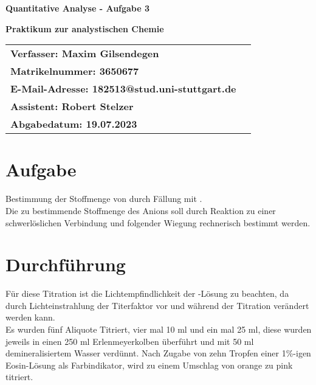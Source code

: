 \documentclass[12pt]{scrartcl} %
\begin{document}
\begin{titlepage}
\begin{center}
\vspace*{2cm}
\begin{LARGE}
\vspace*{1cm}
\textbf{\textsf{Quantitative Analyse - Aufgabe 3\\}}
\end{LARGE}
\vspace*{1cm}
\textbf{\textsf{Praktikum zur analystischen Chemie}}\\
\vspace*{1.5cm}
\begin{table}[H]
\sffamily
\hspace*{3cm}\begin{tabular}{>{\bfseries}l>{\bfseries}l}
Verfasser: Maxim Gilsendegen\\
Matrikelnummer: 3650677\\
E-Mail-Adresse: 182513@stud.uni-stuttgart.de\\
Assistent: Robert Stelzer\\
Abgabedatum: 19.07.2023\\
\end{tabular}
\end{table}
\end{center}
\end{titlepage}
\renewcommand{\thepage}{\Roman{page}}\setcounter{page}{1}
\tableofcontents %
\newpage
\renewcommand{\thepage}{\arabic{page}}\setcounter{page}{1}

\section{Aufgabe}
Bestimmung der Stoffmenge von  durch Fällung mit .\\
Die zu bestimmende Stoffmenge des Anions soll durch Reaktion zu einer schwerlöslichen Verbindung  und folgender Wiegung rechnerisch bestimmt werden.

\section{Durchführung}
Für diese Titration ist die Lichtempfindlichkeit der -Lösung zu beachten, da durch Lichteinstrahlung der Titerfaktor vor und während der Titration verändert werden kann.\\
Es wurden fünf Aliquote Titriert, vier mal 10 ml und ein mal 25 ml, diese wurden jeweils in einen 250 ml Erlenmeyerkolben überführt und mit 50 ml demineralisiertem Wasser verdünnt. Nach Zugabe von zehn Tropfen einer 1\%-igen Eosin-Lösung als Farbindikator, wird zu einem Umschlag von orange zu pink titriert.
\end{document}
